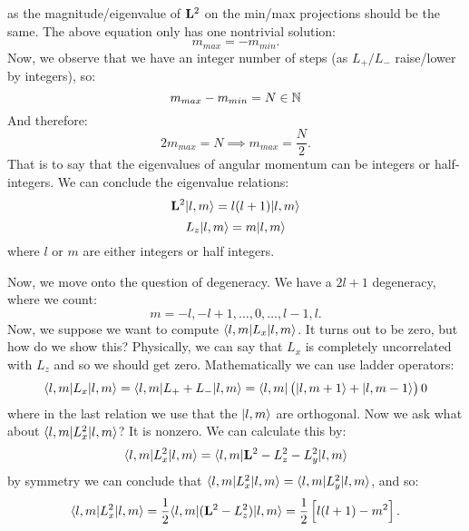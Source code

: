 as the magnitude/eigenvalue of $\mathbf{L}^2$ on the min/max projections should be the same. The above equation only has one nontrivial solution:
\begin{equation}
    m_{max} = -m_{min}.
\end{equation}
Now, we observe that we have an integer number of steps (as $L_+/L_-$ raise/lower by integers), so:
\begin{equation}
    m_{max} - m_{min} = N \in \mathbb{N}
\end{equation}
And therefore:
\begin{equation}
    2m_{max} = N \implies m_{max} = \frac{N}{2}.
\end{equation}
That is to say that the eigenvalues of angular momentum can be integers or half-integers. We can conclude the eigenvalue relations:
\begin{equation}
    \mathbf{L}^2\lvert l, m \rangle = l(l+1)\lvert l, m \rangle
\end{equation}
\begin{equation}
    L_z\lvert l, m \rangle = m\lvert l, m \rangle
\end{equation}
where $l$ or $m$ are either integers or half integers.

Now, we move onto the question of degeneracy. We have a $2l + 1$ degeneracy, where we count:
\begin{equation}
    m = -l, -l + 1, \ldots, 0, \ldots, l - 1, l.
\end{equation}
Now, we suppose we want to compute $\langle l, m \rvert L_x\lvert l, m \rangle$. It turns out to be zero, but how do we show this? Physically, we can say that $L_x$ is completely uncorrelated with $L_z$ and so we should get zero. Mathematically we can use ladder operators:
\begin{equation}
    \langle l, m \rvert L_x\lvert l, m \rangle = \langle l, m \rvert L_+ + L_-\lvert l, m \rangle = \langle l, m \rvert\left(\lvert l, m+1 \rangle + \lvert l, m-1 \rangle\right) 0
\end{equation} 
where in the last relation we use that the $\lvert l, m \rangle$ are orthogonal. Now we ask what about $\langle l, m \rvert L_x^2\lvert l, m \rangle$? It is nonzero. We can calculate this by:
\begin{equation}
    \langle l, m \rvert L_x^2\lvert l, m \rangle = \langle l, m \rvert\mathbf{L}^2 - L_z^2 - L_y^2\lvert l, m \rangle
\end{equation}
by symmetry we can conclude that $\langle l, m \rvert L_x^2\lvert l, m \rangle =\langle l, m \rvert L_y^2\lvert l, m \rangle$, and so:
\begin{equation}
    \langle l, m \rvert L_x^2\lvert l, m \rangle = \frac{1}{2}\langle l, m \rvert(\mathbf{L}^2 - L_z^2)\lvert l, m \rangle = \frac{1}{2}\left[l(l+1) - m^2\right].
\end{equation}